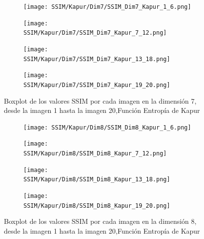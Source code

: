 \documentclass[conference]{IEEEtran}
\begin{document}
\begin{figure}
	\centering
	
	\begin{subfigure}{0.4\textwidth}
		\texttt{[image: SSIM/Kapur/Dim7/SSIM\_Dim7\_Kapur\_1\_6.png]}
	\end{subfigure}
	
	\begin{subfigure}{0.4\textwidth}
		\texttt{[image: SSIM/Kapur/Dim7/SSIM\_Dim7\_Kapur\_7\_12.png]}
	\end{subfigure}
	\begin{subfigure}{0.4\textwidth}
		\texttt{[image: SSIM/Kapur/Dim7/SSIM\_Dim7\_Kapur\_13\_18.png]}
	\end{subfigure}   
	\begin{subfigure}{0.4\textwidth}
		\texttt{[image: SSIM/Kapur/Dim7/SSIM\_Dim7\_Kapur\_19\_20.png]}
		\vspace{-120pt} %
	\end{subfigure}
	\caption{Boxplot de los valores SSIM por cada imagen en la dimensión 7, desde la imagen 1 hasta la imagen 20,Función Entropía de Kapur}
	\label{fig:imagenes}    
\end{figure}

\begin{figure}
	\centering
	
	\begin{subfigure}{0.4\textwidth}
		\texttt{[image: SSIM/Kapur/Dim8/SSIM\_Dim8\_Kapur\_1\_6.png]}
	\end{subfigure}
	
	\begin{subfigure}{0.4\textwidth}
		\texttt{[image: SSIM/Kapur/Dim8/SSIM\_Dim8\_Kapur\_7\_12.png]}
	\end{subfigure}  
	\begin{subfigure}{0.4\textwidth}
		\texttt{[image: SSIM/Kapur/Dim8/SSIM\_Dim8\_Kapur\_13\_18.png]}
	\end{subfigure}   
	\begin{subfigure}{0.4\textwidth}
		\texttt{[image: SSIM/Kapur/Dim8/SSIM\_Dim8\_Kapur\_19\_20.png]}
		\vspace{-120pt} %
	\end{subfigure}
	\caption{Boxplot de los valores SSIM por cada imagen en la dimensión 8, desde la imagen 1 hasta la imagen 20,Función Entropía de Kapur}
	\label{fig:imagenes}    
\end{figure}
\end{document}
